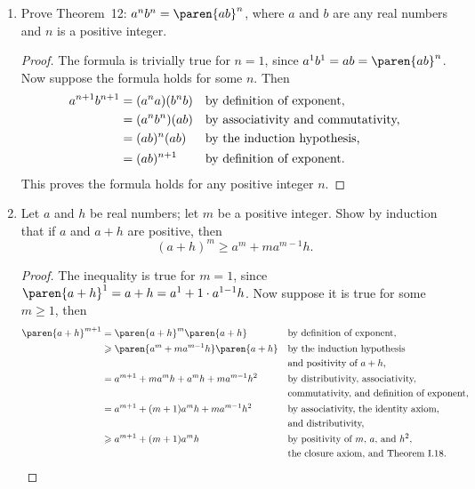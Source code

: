 \documentclass[a4paper]{article}
\begin{document}
\begin{enumerate}
\item Prove Theorem~12: \(a^n b^n = \paren{ab}^n\), where \(a\) and
  \(b\) are any real numbers and \(n\) is a positive integer.

  \begin{proof}
    The formula is trivially true for \(n=1\), since
    \(a^1 b^1 = ab = \paren{ab}^n\).  Now suppose the formula holds
    for some \(n\).  Then
    \begin{align*}
      a^{n+1} b^{n+1}
      &= (a^n a) (b^n b) && \text{by definition of exponent,} \\
      &= (a^n b^n) (ab)  && \text{by associativity and commutativity,} \\
      &= (ab)^n (ab)     && \text{by the induction hypothesis,} \\
      &= (ab)^{n+1}      && \text{by definition of exponent.}
    \end{align*}
    This proves the formula holds for any positive integer \(n\).
  \end{proof}

\item Let \(a\) and \(h\) be real numbers; let \(m\) be a positive
  integer.  Show by induction that if \(a\) and \(a+h\) are positive,
  then
  \[
    (a+h)^m \ge a^m + ma^{m-1}h.
  \]

  \begin{proof}
    The inequality is true for \(m=1\), since
    \(\paren{a+h}^1 = a + h = a^1 + 1 \cdot a^{1-1} h\).  Now suppose it
    is true for some \(m \ge 1\), then
    \begin{align*}
      \paren{a+h}^{m+1}
      &= \paren{a+h}^m \paren{a+h}              && \reason{by definition of exponent,} \\
      &\ge \paren{a^m + ma^{m-1}h} \paren{a+h}  && \reason{by the induction hypothesis} \\
      &                                         && \reason{and positivity of \(a+h\),} \\
      &= a^{m+1} + ma^m h + a^m h + ma^{m-1}h^2 && \reason{by distributivity, associativity,} \\
      &                                         && \reason{commutativity, and definition of exponent,} \\
      &= a^{m+1} + (m+1)a^m h + ma^{m-1}h^2     && \reason{by associativity, the identity axiom,} \\
      &                                         && \reason{and distributivity,} \\
      &\ge a^{m+1} + (m+1)a^m h                 && \reason{by positivity of \(m\), \(a\), and \(h^2\),} \\
      &                                         && \reason{the closure axiom, and Theorem~I.18.} \qedhere
    \end{align*}
  \end{proof}


\end{enumerate}
\end{document}
